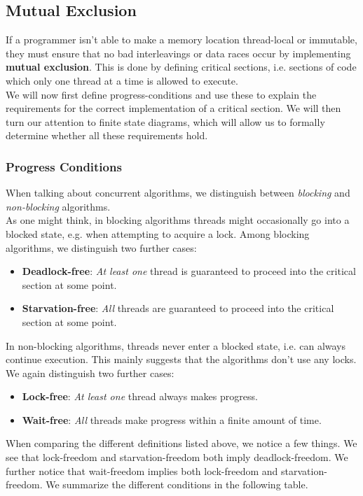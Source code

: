 \documentclass[main]{subfiles}
\begin{document}
\subsection{Mutual Exclusion}
If a programmer isn't able to make a memory location thread-local or immutable, they must ensure that no bad interleavings or data races occur by implementing \textbf{mutual exclusion}. This is done by defining critical sections, i.e. sections of code which only one thread at a time is allowed to execute.\\[3mm]
We will now first define progress-conditions and use these to explain the requirements for the correct implementation of a critical section. We will then turn our attention to finite state diagrams, which will allow us to formally determine whether all these requirements hold. 

\subsubsection{Progress Conditions} \label{progress conditions}
When talking about concurrent algorithms, we distinguish between \textit{blocking} and \textit{non-blocking} algorithms.\\[3mm]
As one might think, in blocking algorithms threads might occasionally go into a blocked state, e.g. when attempting to acquire a lock. Among blocking algorithms, we distinguish two further cases:
\begin{itemize}
    \item \textbf{Deadlock-free}: \textit{At least one} thread is guaranteed to proceed into the critical section at some point.
    \item \textbf{Starvation-free}: \textit{All} threads are guaranteed to proceed into the critical section at some point.
\end{itemize} 
In non-blocking algorithms, threads never enter a blocked state, i.e. can always continue execution. This mainly suggests that the algorithms don't use any locks. We again distinguish two further cases:
\begin{itemize}
    \item \textbf{Lock-free}: \textit{At least one} thread always makes progress.
    \item \textbf{Wait-free}: \textit{All} threads make progress within a finite amount of time.
\end{itemize}
When comparing the different definitions listed above, we notice a few things. We see that lock-freedom and starvation-freedom both imply deadlock-freedom. We further notice that wait-freedom implies both lock-freedom and starvation-freedom. We summarize the different conditions in the following table.
\end{document}
